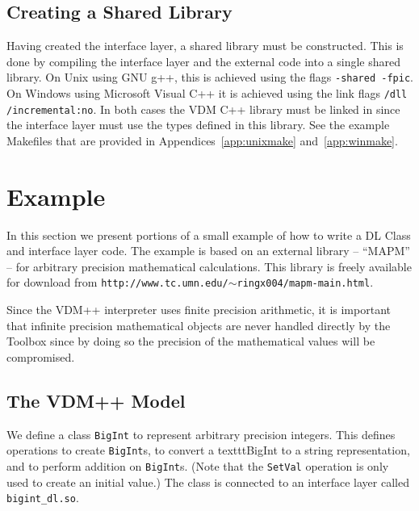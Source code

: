 \documentclass[\pformat,12pt]{article}
\begin{document}
\subsection{Creating a Shared Library}

Having created the interface layer, a shared library must be
constructed. This is done by compiling the interface layer and the
external code into a single shared library. On Unix using GNU g++, this
is achieved using the flags \texttt{-shared -fpic}. On Windows using
Microsoft Visual C++ it is achieved using the link flags
\texttt{/dll /incremental:no}. In both cases the VDM C++ library must
be linked in since the interface layer must use the types defined in
this library. See the example Makefiles that are provided in
Appendices~\ref{app:unixmake} and~\ref{app:winmake}. 

\section{Example}\label{sec:dlexample}

In this section we present portions of a small example of how to
write a DL Class and interface layer code. The example is based on an
external library -- ``MAPM'' -- for arbitrary precision mathematical
calculations. This library is freely available for download from 
\texttt{http://www.tc.umn.edu/$\sim$ringx004/mapm-main.html}.

Since the VDM++ interpreter uses finite precision arithmetic, it is
important that infinite precision mathematical objects are never
handled directly by the Toolbox since by doing so the precision of
the mathematical values will be compromised. 

\subsection{The VDM++ Model}

We define a class \texttt{BigInt} to represent arbitrary precision
integers. This defines operations to create \texttt{BigInt}s, to
convert a texttt{BigInt} to a string representation, and to perform
addition on \texttt{BigInt}s. (Note that the \texttt{SetVal} operation is
only used to create an initial value.) The class is connected to an
interface layer called \texttt{bigint\_dl.so}. 
\end{document}
